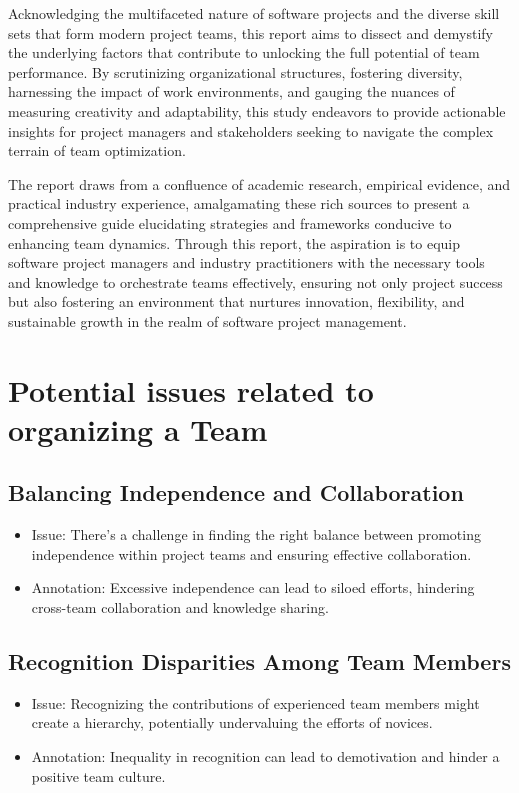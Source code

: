 \documentclass[a4paper, twoside]{article}
\begin{document}
Acknowledging the multifaceted nature of software projects and the diverse skill sets that form modern project teams, this report aims to dissect and demystify the underlying factors that contribute to unlocking the full potential of team performance. By scrutinizing organizational structures, fostering diversity, harnessing the impact of work environments, and gauging the nuances of measuring creativity and adaptability, this study endeavors to provide actionable insights for project managers and stakeholders seeking to navigate the complex terrain of team optimization.

The report draws from a confluence of academic research, empirical evidence, and practical industry experience, amalgamating these rich sources to present a comprehensive guide elucidating strategies and frameworks conducive to enhancing team dynamics. Through this report, the aspiration is to equip software project managers and industry practitioners with the necessary tools and knowledge to orchestrate teams effectively, ensuring not only project success but also fostering an environment that nurtures innovation, flexibility, and sustainable growth in the realm of software project management.


\section{Potential issues related to organizing a Team}
\subsection{Balancing Independence and Collaboration}
\begin{itemize}
  \item{Issue}: There's a challenge in finding the right balance between promoting independence within project teams and ensuring effective collaboration.
  \item{Annotation}: Excessive independence can lead to siloed efforts, hindering cross-team collaboration and knowledge sharing.\cite{Tuckman1965}
\end{itemize}

\subsection{Recognition Disparities Among Team Members}
\begin{itemize}
  \item{Issue}: Recognizing the contributions of experienced team members might create a hierarchy, potentially undervaluing the efforts of novices.
  \item{Annotation}: Inequality in recognition can lead to demotivation and hinder a positive team culture.\cite{Deci2001}
\end{itemize}
\end{document}
